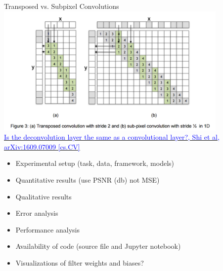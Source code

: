 \documentclass[]{beamer}
\begin{document}
\begin{frame}{Transposed vs. Subpixel Convolutions}
\centering
\includegraphics[width=0.85\textwidth]{figures/shi-subpixel-vs-transposed} \\
\href{https://arxiv.org/abs/1609.07009}
{\textcolor{blue}{Is the deconvolution layer the same as a convolutional layer?, Shi et al, arXiv:1609.07009 [cs.CV]}}
\end{frame}


\begin{frame}
\begin{itemize}
\item Experimental setup (task, data, framework, models)
\item Quantitative results (use PSNR (db) not MSE)
\item Qualitative results
\item Error analysis
\item Performance analysis
\item Availability of code (source file and Jupyter notebook)
\item Visualizations of filter weights and biases?
\end{itemize}
\end{frame}
\end{document}
